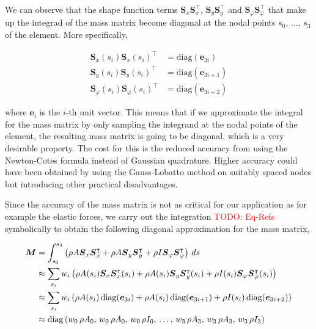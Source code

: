 We can observe that the shape function terms $\boldsymbol{S}_x\boldsymbol{S}_x^\intercal$, $\boldsymbol{S}_y\boldsymbol{S}_y^\intercal$ and $\boldsymbol{S}_\varphi\boldsymbol{S}_\varphi^\intercal$ that make up the integrad of the mass matrix become diagonal at the nodal points $s_{0},\,\ldots,\,s_{3}$ of the element.
More specifically,

\begin{align}
\boldsymbol{S}_x(s_i)\boldsymbol{S}_x(s_i)^\intercal &= \mathrm{diag}(\boldsymbol{e}_{3i}) \\
\boldsymbol{S}_y(s_i)\boldsymbol{S}_y(s_i)^\intercal &= \mathrm{diag}(\boldsymbol{e}_{3i+1}) \\
\boldsymbol{S}_\varphi(s_i)\boldsymbol{S}_\varphi(s_i)^\intercal &= \mathrm{diag}(\boldsymbol{e}_{3i+2})
\end{align}

where $\boldsymbol{e}_{i}$ is the $i$-th unit vector.
This means that if we approximate the integral for the mass matrix by only sampling the integrand at the nodal points of the element, the resulting mass matrix is going to be diagonal, which is a very desirable property.
The cost for this is the reduced accuracy from using the Newton-Cotes formula instead of Gaussian quadrature.
Higher accuracy could have been obtained by using the Gauss-Lobatto method on suitably spaced nodes but introducing other practical disadvantages.

Since the accuracy of the mass matrix is not as critical for our application as for example the elastic forces, we carry out the integration \textcolor{red}{TODO: Eq-Refs} symbolically to obtain the following diagonal approximation for the mass matrix,

\begin{align}
\boldsymbol{M} &= \int_{s_0}^{s_3} \left(\rho A \boldsymbol{S}_x\boldsymbol{S}_x^\intercal + \rho A \boldsymbol{S}_y\boldsymbol{S}_y^\intercal + \rho I\boldsymbol{S}_\varphi\boldsymbol{S}_\varphi^\intercal\right)\,ds \notag \\
&\approx \sum_{s_i}w_i\left(\rho A(s_i)\boldsymbol{S}_x\boldsymbol{S}_x^\intercal(s_i) + \rho A(s_i)\boldsymbol{S}_y\boldsymbol{S}_y^\intercal(s_i) + \rho I(s_i)\boldsymbol{S}_\varphi\boldsymbol{S}_\varphi^\intercal(s_i)\right) \notag \\
&\approx  \sum_{s_i}w_i\left(\rho A(s_i)\,\mathrm{diag}(\boldsymbol{e}_{3i}) + \rho A(s_i)\,\mathrm{diag}(\boldsymbol{e}_{3i+1}) + \rho I(s_i)\,\mathrm{diag}(\boldsymbol{e}_{3i+2})\right) \notag \\
&\approx  \mathrm{diag}\left(w_0\,\rho A_0,\,w_0\,\rho A_0,\,w_0\,\rho I_0,\,\ldots,\,w_3\,\rho A_3,\,w_3\,\rho A_3,\,w_3\,\rho I_3\right)
\end{align}

